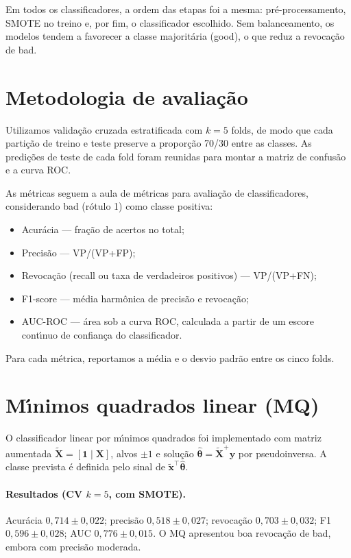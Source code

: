 \documentclass[12pt,a4paper]{article}
\begin{document}
Em todos os classificadores, a ordem das etapas foi a mesma: pr\'e-processamento, SMOTE no treino e, por fim, o classificador escolhido.
Sem balanceamento, os modelos tendem a favorecer a classe majorit\'aria (good), o que reduz a revoca\c{c}\~ao de bad.

\section*{Metodologia de avalia\c{c}\~ao}

Utilizamos valida\c{c}\~ao cruzada estratificada com $k=5$ folds, de modo que cada parti\c{c}\~ao de treino e teste preserve a propor\c{c}\~ao 70/30 entre as classes.
As predi\c{c}\~oes de teste de cada fold foram reunidas para montar a matriz de confus\~ao e a curva ROC.

As m\'etricas seguem a aula de m\'etricas para avalia\c{c}\~ao de classificadores, considerando bad (r\'otulo 1) como classe positiva:

\begin{itemize}
  \item Acur\'acia --- fra\c{c}\~ao de acertos no total;
  \item Precis\~ao --- VP/(VP+FP);
  \item Revoca\c{c}\~ao (recall ou taxa de verdadeiros positivos) --- VP/(VP+FN);
  \item F1-score --- m\'edia harm\^onica de precis\~ao e revoca\c{c}\~ao;
  \item AUC-ROC --- \'area sob a curva ROC, calculada a partir de um escore cont\'{\i}nuo de confian\c{c}a do classificador.
\end{itemize}

Para cada m\'etrica, reportamos a m\'edia e o desvio padr\~ao entre os cinco folds.

\section*{M\'{\i}nimos quadrados linear (MQ)}

O classificador linear por m\'{\i}nimos quadrados foi implementado com matriz aumentada $\tilde{\boldsymbol{X}}=[\mathbf{1}\mid\boldsymbol{X}]$, alvos $\pm 1$ e solu\c{c}\~ao $\hat{\boldsymbol{\theta}}=\tilde{\boldsymbol{X}}^+\boldsymbol{y}$ por pseudoinversa.
A classe prevista \'e definida pelo sinal de $\tilde{\boldsymbol{x}}^\top\hat{\boldsymbol{\theta}}$.

\paragraph{Resultados (CV $k{=}5$, com SMOTE).}
Acur\'acia $0{,}714 \pm 0{,}022$; precis\~ao $0{,}518 \pm 0{,}027$; revoca\c{c}\~ao $0{,}703 \pm 0{,}032$; F1 $0{,}596 \pm 0{,}028$; AUC $0{,}776 \pm 0{,}015$.
O MQ apresentou boa revoca\c{c}\~ao de bad, embora com precis\~ao moderada.
\end{document}
